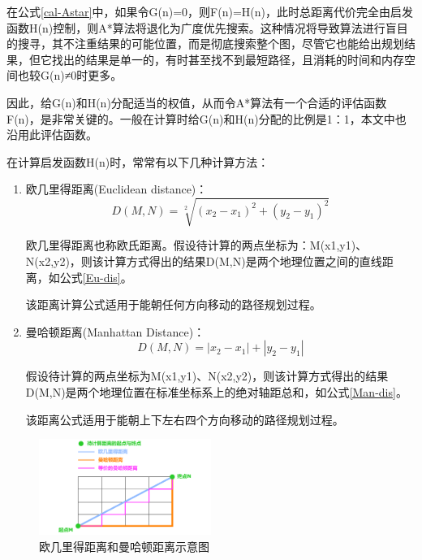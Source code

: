 在公式\ref{cal-Astar}中，如果令G(n)=0，则F(n)=H(n)，此时总距离代价完全由启发函数H(n)控制，则A*算法将退化为广度优先搜索。这种情况将导致算法进行盲目的搜寻，其不注重结果的可能位置，而是彻底搜索整个图，尽管它也能给出规划结果，但它找出的结果是单一的，有时甚至找不到最短路径，且消耗的时间和内存空间也较G(n)≠0时更多。

因此，给G(n)和H(n)分配适当的权值，从而令A*算法有一个合适的评估函数F(n)，是非常关键的。一般在计算时给G(n)和H(n)分配的比例是1：1，本文中也沿用此评估函数。

在计算启发函数H(n)时，常常有以下几种计算方法：

\begin{enumerate}
    \item 欧几里得距离(Euclidean distance)：
        \begin{equation}
            D(M,N)=\sqrt[2]{ (x_{2}-x_{1})^{2} + (y_{2}-y_{1})^{2}} 
        \label{Eu-dis}
        \end{equation}

        欧几里得距离也称欧氏距离。假设待计算的两点坐标为：M(x1,y1)、N(x2,y2)，则该计算方式得出的结果D(M,N)是两个地理位置之间的直线距离，如公式\ref{Eu-dis}。
        
        该距离计算公式适用于能朝任何方向移动的路径规划过程。
    
    \item 曼哈顿距离(Manhattan Distance)：
        \begin{equation}
            D(M,N)=\left | x_2-x_1 \right | + \left | y_2-y_1 \right |
            \label{Man-dis}
        \end{equation}
        
        假设待计算的两点坐标为M(x1,y1)、N(x2,y2)，则该计算方式得出的结果D(M,N)是两个地理位置在标准坐标系上的绝对轴距总和，如公式\ref{Man-dis}。

        该距离公式适用于能朝上下左右四个方向移动的路径规划过程。
\end{enumerate}

\begin{figure}[ht]
  \centering
  \includegraphics[width=0.5\textwidth]{undergraduate-thesis/images/EuDis_and_ManDis.png}
  \caption{欧几里得距离和曼哈顿距离示意图}
  \label{EuDisAndManDis} %
\end{figure}

